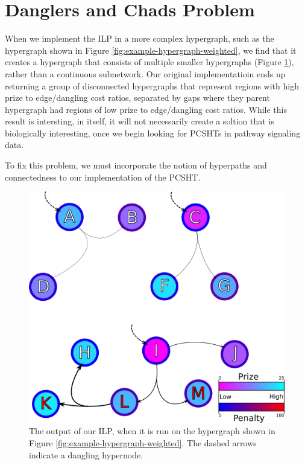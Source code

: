 \documentclass[12pt,twoside]{reedthesis}
\theoremstyle{definition}
\begin{document}
\section{Danglers and Chads Problem}

When we implement the ILP in a more complex hypergraph, such as the hypergraph shown in Figure \ref{fig:example-hypergraph-weighted}, we find that it creates a hypergraph that consists of multiple smaller hypergraphs (Figure \ref{fig:example-hypergraph-weighted-after-ILP}), rather than a continuous subnetwork. Our original implementatioin ends up returning a group of disconnected hypergraphs that represent regions with high prize to edge/dangling cost ratios, separated by gaps where they parent hypergraph had regions of low prize to edge/dangling cost ratios. While this result is intersting, in itself, it will not necessarily create a soltion that is biologically interesting, once we begin looking for PCSHTs in pathway signaling data.\par

To fix this problem, we must incorporate the notion of hyperpaths and connectedness to our implementation of the PCSHT.
\begin{figure}[thbp]
  \begin{center}
    \includegraphics{example-hypergraph-weighted-after-ILP}
  \caption{The output of our ILP, when it is run on the hypergraph shown in Figure \ref{fig:example-hypergraph-weighted}. The dashed arrows indicate a dangling hypernode.}
  \label{fig:example-hypergraph-weighted-after-ILP}
  \end{center}
\end{figure}
\end{document}
